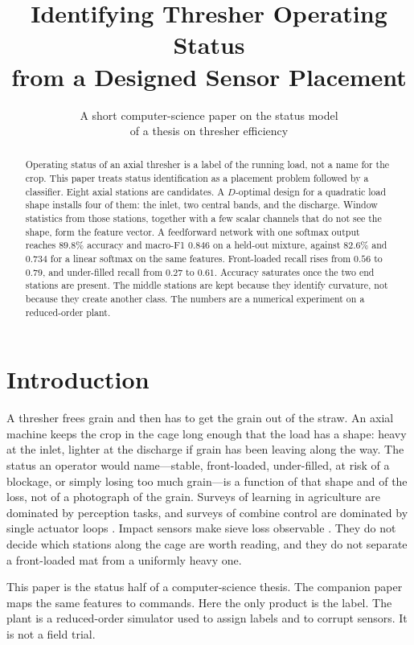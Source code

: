 \documentclass[11pt,a4paper]{article}
\title{Identifying Thresher Operating Status\\from a Designed Sensor Placement}
\author{A short computer-science paper on the status model\\of a thesis on thresher efficiency}
\date{}
\begin{document}
\maketitle
\thispagestyle{empty}

\begin{abstract}
\noindent
Operating status of an axial thresher is a label of the running load, not a name for the crop. This paper treats status identification as a placement problem followed by a classifier. Eight axial stations are candidates. A \(D\)-optimal design for a quadratic load shape installs four of them: the inlet, two central bands, and the discharge. Window statistics from those stations, together with a few scalar channels that do not see the shape, form the feature vector. A feedforward network with one softmax output reaches \(89.8\%\) accuracy and macro-F1 \(0.846\) on a held-out mixture, against \(82.6\%\) and \(0.734\) for a linear softmax on the same features. Front-loaded recall rises from \(0.56\) to \(0.79\), and under-filled recall from \(0.27\) to \(0.61\). Accuracy saturates once the two end stations are present. The middle stations are kept because they identify curvature, not because they create another class. The numbers are a numerical experiment on a reduced-order plant.
\end{abstract}

\section{Introduction}

A thresher frees grain and then has to get the grain out of the straw. An axial machine keeps the crop in the cage long enough that the load has a shape: heavy at the inlet, lighter at the discharge if grain has been leaving along the way. The status an operator would name---stable, front-loaded, under-filled, at risk of a blockage, or simply losing too much grain---is a function of that shape and of the loss, not of a photograph of the grain. Surveys of learning in agriculture are dominated by perception tasks, and surveys of combine control are dominated by single actuator loops \cite{kamilaris2018,liakos2018,chen2025}. Impact sensors make sieve loss observable \cite{liang2016,zhao2011}. They do not decide which stations along the cage are worth reading, and they do not separate a front-loaded mat from a uniformly heavy one.

This paper is the status half of a computer-science thesis. The companion paper maps the same features to commands. Here the only product is the label. The plant is a reduced-order simulator used to assign labels and to corrupt sensors. It is not a field trial.
\end{document}
